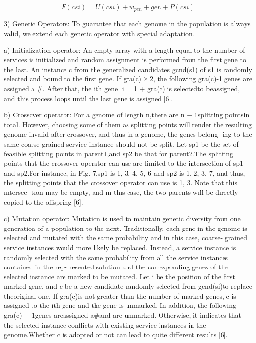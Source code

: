 \documentclass[10pt,journal,compsoc]{IEEEtran}
\begin{document}
\begin{equation}
F(csi) = U(csi) + w_{pen} + gen + P(csi)
\end{equation}

3) Genetic Operators: To guarantee that each genome in the population is always valid, we extend each genetic operator with special adaptation. 

a) Initialization operator: An empty array with a length equal to the number of services is initialized and random assignment is performed from the first gene to the last. An instance c from the generalized candidates gcnd(s1) of s1 is randomly selected and bound to the first gene. If gra(c) ≥ 2, the following gra(c)-1 genes are assigned a $\#$. After that, the ith gene [i = 1 + gra(c)]is selectedto beassigned, and this process loops until the last gene is assigned [6].

b) Crossover operator: For a genome of length n,there are n − 1splitting pointsin total. However, choosing some of them as splitting points will render the resulting genome invalid after crossover, and thus in a genome, the genes belong- ing to the same coarse-grained service instance should not be split. Let sp1 be the set of feasible splitting points in parent1,and sp2 be that for parent2.The splitting points that the crossover operator can use are limited to the intersection of sp1 and sp2.For instance, in Fig. 7,sp1 is {1, 3, 4, 5, 6} and sp2 is {1, 2, 3, 7}, and thus, the splitting points that the crossover operator can use is {1, 3}. Note that this intersec- tion may be empty, and in this case, the two parents will be directly copied to the offspring [6].


c) Mutation operator: Mutation is used to maintain genetic diversity from one generation of a population to the next. Traditionally, each gene in the genome is selected and mutated with the same probability and in this case, coarse- grained service instances would more likely be replaced. Instead, a service instance is randomly selected with the same probability from all the service instances contained in the rep- resented solution and the corresponding genes of the selected instance are marked to be mutated. Let i be the position of the first marked gene, and c be a new candidate randomly selected from gcnd(si)to replace theoriginal one. If gra(c)is not greater than the number of marked genes, c is assigned to the ith gene and the gene is unmarked. In addition, the following gra(c) − 1genes areassigned a$\#$and are unmarked. Otherwise, it indicates that the selected instance conflicts with existing service instances in the genome.Whether c is adopted or not can lead to quite different results [6].
\end{document}
